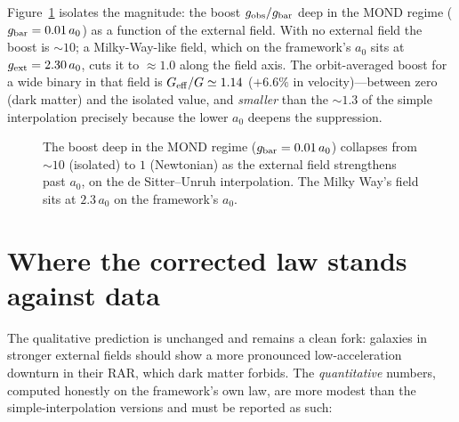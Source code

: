 \documentclass[aps,prd,twocolumn,10pt,nofootinbib]{revtex4-2}
\begin{document}
Figure~\ref{fig:boost} isolates the magnitude: the boost $g_{\rm obs}/g_{\rm bar}$ deep in the MOND regime
($g_{\rm bar}=0.01\,a_0$) as a function of the external field. With no external field the boost is $\sim\!10$;
a Milky-Way-like field, which on the framework's $a_0$ sits at $g_{\rm ext}=2.30\,a_0$, cuts it to $\approx1.0$
along the field axis. The orbit-averaged boost for a wide binary in that field is $G_{\rm eff}/G\simeq1.14$
($+6.6\%$ in velocity)---between zero (dark matter) and the isolated value, and \emph{smaller} than the $\sim1.3$
of the simple interpolation precisely because the lower $a_0$ deepens the suppression.

\begin{figure}[t]
\centering
{}
\caption{The boost deep in the MOND regime ($g_{\rm bar}=0.01\,a_0$) collapses from $\sim\!10$ (isolated) to $1$
(Newtonian) as the external field strengthens past $a_0$, on the de Sitter--Unruh interpolation. The Milky Way's
field sits at $2.3\,a_0$ on the framework's $a_0$.}
\label{fig:boost}
\end{figure}

\section{Where the corrected law stands against data}
The qualitative prediction is unchanged and remains a clean fork: galaxies in stronger external fields should show
a more pronounced low-acceleration downturn in their RAR, which dark matter forbids. The \emph{quantitative}
numbers, computed honestly on the framework's own law, are more modest than the simple-interpolation versions and
must be reported as such:
\end{document}
